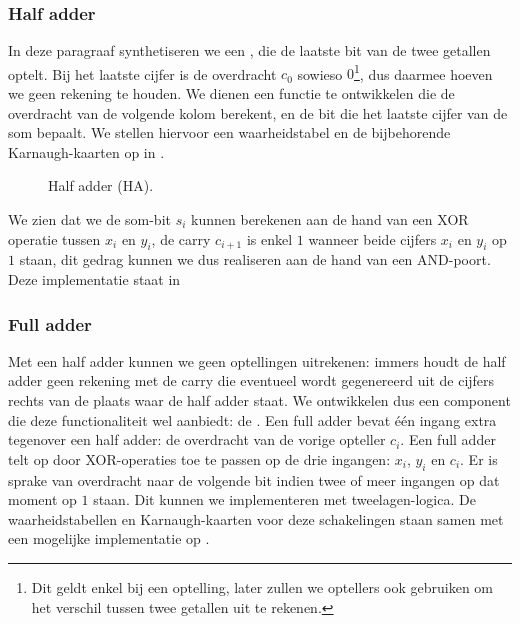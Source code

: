 \subsubsection{Half adder}
In deze paragraaf synthetiseren we een , die de laatste bit van de twee getallen optelt. Bij het laatste cijfer is de overdracht $c_0$ sowieso $0$\footnote{Dit geldt enkel bij een optelling, later zullen we optellers ook gebruiken om het verschil tussen twee getallen uit te rekenen.}, dus daarmee hoeven we geen rekening te houden. We dienen een functie te ontwikkelen die de overdracht van de volgende kolom berekent, en de bit die het laatste cijfer van de som bepaalt. We stellen hiervoor een waarheidstabel en de bijbehorende Karnaugh-kaarten op in .

\begin{figure}[hbt]
\centering
{}
\caption{Half adder (HA).}
\end{figure}
We zien dat we de som-bit $s_i$ kunnen berekenen aan de hand van een XOR operatie tussen $x_i$ en $y_i$, de carry $c_{i+1}$ is enkel $1$ wanneer beide cijfers $x_i$ en $y_i$ op $1$ staan, dit gedrag kunnen we dus realiseren aan de hand van een AND-poort. Deze implementatie staat in 

\subsubsection{Full adder}
Met een half adder kunnen we geen optellingen uitrekenen: immers houdt de half adder geen rekening met de carry die eventueel wordt gegenereerd uit de cijfers rechts van de plaats waar de half adder staat. We ontwikkelen dus een component die deze functionaliteit wel aanbiedt: de . Een full adder bevat \'e\'en ingang extra tegenover een half adder: de overdracht van de vorige opteller $c_i$. Een full adder telt op door XOR-operaties toe te passen op de drie ingangen: $x_i$, $y_i$ en $c_i$. Er is sprake van overdracht naar de volgende bit indien twee of meer ingangen op dat moment op $1$ staan. Dit kunnen we implementeren met tweelagen-logica. De waarheidstabellen en Karnaugh-kaarten voor deze schakelingen staan samen met een mogelijke implementatie op .

